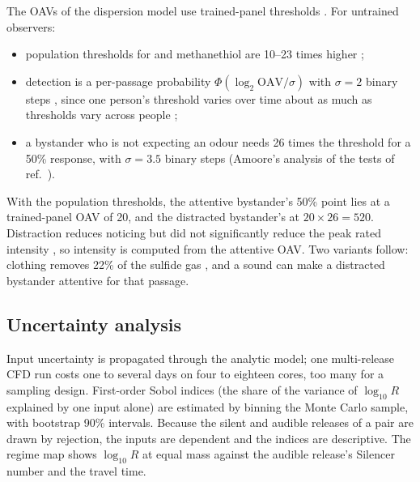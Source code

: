 The OAVs of the dispersion model use trained-panel thresholds \cite{nagata2003}. For untrained observers:
\begin{itemize}
  \item population thresholds for  and methanethiol are 10--23 times higher \cite{amoore1983,wilby1969};
  \item detection is a per-passage probability $\Phi(\log_2\mathrm{OAV}/\sigma)$ with $\sigma = 2$ binary steps
  \cite{amoore1983}, since one person's threshold varies over time about as much as thresholds vary across people
  \cite{stevens1988};
  \item a bystander who is not expecting an odour needs 26 times the threshold for a 50\% response, with
  $\sigma = 3.5$ binary steps (Amoore's analysis \cite{amoore1983} of the tests of ref.~).
\end{itemize}
With the population thresholds, the attentive bystander's 50\% point lies at a trained-panel OAV of 20, and the
distracted bystander's at $20\times26 = 520$.
Distraction reduces noticing \cite{forster2018} but did not significantly reduce the peak rated intensity \cite{fallon2018}, so intensity is
computed from the attentive OAV. Two variants follow: clothing removes 22\% of the sulfide gas \cite{ohge2005}, and a
sound can make a distracted bystander attentive for that passage.

\subsection{Uncertainty analysis}
\label{sec:uq}
Input uncertainty is propagated through the analytic model; one multi-release CFD run costs one to several days on
four to eighteen cores, too many for a sampling design. First-order Sobol indices (the share of the variance of $\log_{10} R$ explained by one input
alone) are estimated by binning the Monte Carlo sample, with bootstrap 90\% intervals. Because the silent and audible
releases of a pair are drawn by rejection, the inputs are dependent and the indices are descriptive. The regime map
shows $\log_{10} R$ at equal mass against the audible release's Silencer number and the travel time.

